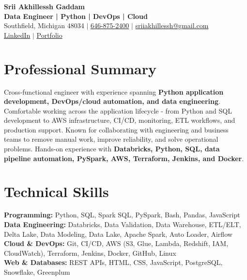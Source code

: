 \documentclass[letterpaper,10pt]{article}
\begin{document}
\fontsize{9.35pt}{10.45pt}\selectfont

\begin{center}
    {\LARGE \textbf{Srii Akhillessh Gaddam}} \\[-1pt]
    \textbf{Data Engineer | Python | DevOps | Cloud} \\[2pt]
    Southfield, Michigan 48034 $|$
    \href{tel:6468752400}{646-875-2400} $|$
    \href{mailto:sriiakhillessh@gmail.com}{sriiakhillessh@gmail.com} \\[1pt]
    \href{https://www.linkedin.com/in/srii-akhiilessh-gaddam-b48668191/}{LinkedIn} $|$
    \href{https://sriiakhillesshg.github.io/portfolio/}{Portfolio}
\end{center}
\vspace{-8pt}

\section{Professional Summary}
\small{Cross-functional engineer with experience spanning \textbf{Python application development, DevOps/cloud automation, and data engineering}. Comfortable working across the application lifecycle - from Python and SQL development to AWS infrastructure, CI/CD, monitoring, ETL workflows, and production support. Known for collaborating with engineering and business teams to remove manual work, improve reliability, and solve operational problems. Hands-on experience with \textbf{Databricks, Python, SQL, data pipeline automation, PySpark, AWS, Terraform, Jenkins, and Docker}.}

\section{Technical Skills}
\small{
\textbf{Programming:} Python, SQL, Spark SQL, PySpark, Bash, Pandas, JavaScript \\
\textbf{Data Engineering:} Databricks, Data Validation, Data Warehouse, ETL/ELT, Delta Lake, Data Modeling, Data Lake, Apache Spark, Auto Loader, Airflow \\
\textbf{Cloud \& DevOps:} Git, CI/CD, AWS (S3, Glue, Lambda, Redshift, IAM, CloudWatch), Terraform, Jenkins, Docker, GitHub, Linux \\
\textbf{Web \& Databases:} REST APIs, HTML, CSS, JavaScript, PostgreSQL, Snowflake, Greenplum
}
\end{document}
